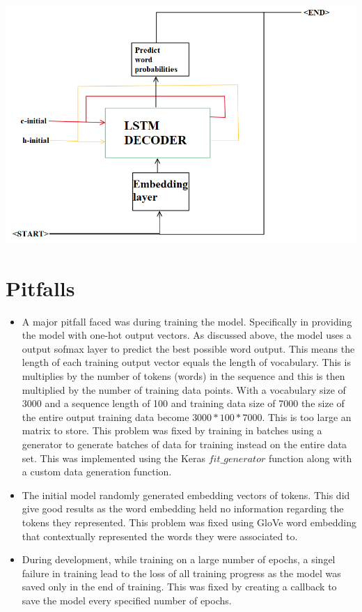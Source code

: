 \documentclass[12pt]{article}
\begin{document}
\begin{center}
\includegraphics[width=160mm]{inference.png}
\end{center}

\section*{Pitfalls}
\begin{itemize}
    \item A major pitfall faced was during training the model. Specifically in providing the model with one-hot output vectors. As discussed above, the model uses a output sofmax layer to predict the best possible word output. This means the length of each training output vector equals the length of vocabulary. This is multiplies by the number of tokens (words) in the sequence and this is then multiplied by the number of training data points. With a vocabulary size of 3000 and a sequence length of 100 and training data size of 7000 the size of the entire output training data become $3000*100*7000$. This is too large an matrix to store. This problem was fixed by training in batches using a generator to generate batches of data for training instead on the entire data set. This was implemented using the Keras $fit\_generator$ function along with a custom data generation function. 
    \item The initial model randomly generated embedding vectors of tokens. This did give good results as the word embedding held no information regarding the tokens they represented. This problem was fixed using GloVe word embedding that contextually represented the words they were associated to.
    \item During development, while training on a large number of epochs, a singel failure in training lead to the loss of all training progress as the model was saved only in the end of training. This was fixed by creating a callback to save the model every specified number of epochs.
\end{itemize}
\end{document}
